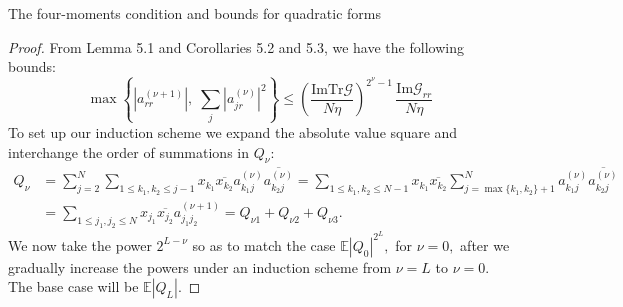\documentclass[11pt, a4paper, oneside]{book}
\numberwithin{equation}{chapter}
\newcommand{\E}{\mathbb E}
\newcommand{\Tr}{\mathrm{Tr}}
\begin{document}
\begin{section}{The four-moments condition and bounds for quadratic forms}
\begin{proof}
From \cite{gotze2016optimal} Lemma 5.1 and Corollaries 5.2 and 5.3, we have the following bounds:
%
\begin{equation}
\label{e:arr}\max \left \{|a_{rr}^{(\nu+1)}|,\; \sum_j |a_{jr}^{( \nu)}|^2 \right \}\leq \left(\frac{\mathrm{Im} \Tr \mathcal{G}  }{N\eta}\right)^{2^\nu-1}\, \frac{\mathrm{Im} \mathcal{G}_{rr} }{N\eta}\end{equation}
%
To set up our induction scheme we expand the absolute value square and interchange the order of summations in $Q_\nu $:
%
\begin{align}\label{e:decomp}
Q_{\nu}  &= \sum \limits_{j=2}^N  \sum_{ 1 \leq k_1, k_2 \leq j-1}x_{k_1} \overline{x_{k_2}}  a_{k_1j}^{(\nu)}\overline{a_{k_2j}^{(\nu)}}
= \sum_{1 \leq k_1, k_2 \leq N-1}x_{k_1} \overline{x_{k_2}} \sum \limits_{j= \max\{k_1, k_2\}+1}^{N}  a_{k_1j}^{(\nu)}\overline{a_{k_2j}^{(\nu)}} \nonumber
  \\
  &= \sum_{1 \leq j_1, j_2 \leq N}x_{j_1} \overline{x_{j_2}}   a_{j_1j_2}^{(\nu+1)}
   = Q_{\nu 1}  + Q_{\nu 2}  + Q_{\nu 3}.
\end{align}
%
We now take the power $2^{L-\nu}$ so as to match the case $\E |Q_0|^{2^L},$ for $\nu = 0,$ after we gradually increase the powers under an induction scheme from $\nu = L$ to $\nu = 0.$ The base case will be $\E |Q_L|$.


\end{proof}
\end{section}
\end{document}
